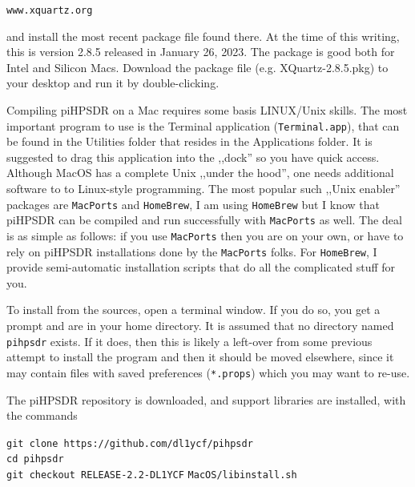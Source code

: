 \documentclass[12pt]{book}
\def\grtt#1{\texttt{\color{magenta}#1}}
\begin{document}
\texttt{www.xquartz.org}

and install the most recent package file found there. At the time of this writing, this is version 2.8.5
released in January 26, 2023. The package is good both for Intel and Silicon Macs. Download the package
file (e.g. XQuartz-2.8.5.pkg) to your desktop and run it by double-clicking.


Compiling piHPSDR on a Mac requires some basis LINUX/Unix skills. The most important program to use is
the Terminal application (\texttt{Terminal.app}), that can be found in the Utilities folder that resides
in the Applications folder. It is suggested to drag this application into the ,,dock'' so you have quick 
access.
Although MacOS has a complete Unix ,,under the hood'', one needs additional software to to Linux-style
programming. The most popular such ,,Unix enabler'' packages are \texttt{MacPorts} and \texttt{HomeBrew}, I 
am using
\texttt{HomeBrew} but I know that piHPSDR can be compiled and run successfully with \texttt{MacPorts}
as well. The deal is as simple as follows: if you use \texttt{MacPorts} then you are on your own, or
have to rely on piHPSDR installations done by the \texttt{MacPorts} folks. For \texttt{HomeBrew},
I provide semi-automatic installation scripts that do all the complicated stuff for you.

To install from the sources, open a terminal window. If you do so, you get
a prompt and are in your home directory. It is assumed that no directory named \texttt{pihpsdr}
exists. If it does, then this is likely a left-over from some previous
attempt to install the program and then it should be moved elsewhere, since it may contain
files with saved preferences (\texttt{*.props}) which you may want to re-use.

The piHPSDR repository is downloaded, and support libraries are installed, with the commands

\grtt{git clone https://github.com/dl1ycf/pihpsdr} \\
\grtt{cd pihpsdr} \\
\grtt{git checkout RELEASE-2.2-DL1YCF}
\grtt{MacOS/libinstall.sh} \\


\begin{center}
\end{center}
\end{document}
